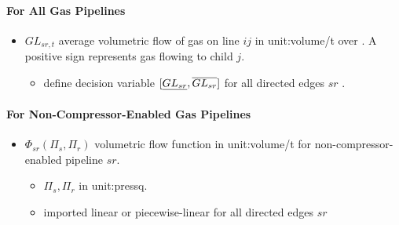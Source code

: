 \paragraph{For All Gas Pipelines}
\begin{itemize}

\item $GL_{sr,t}$ average volumetric flow of gas on line $ij$ in
\gls{unit:volume/t}
over \intervaloft{}. A positive sign represents gas flowing to child
  $j$.  \begin{itemize} \item \gls{define} decision variable
  $[\underline{GL_{sr}}, \overline{GL_{sr}}]$ for all directed edges
  $sr$ \atallt{}.  \end{itemize}
  \end{itemize}

\paragraph{For Non-Compressor-Enabled Gas Pipelines}
\begin{itemize}

\item $\Phi_{sr}(\Pi_s, \Pi_r)$ volumetric flow function in \gls{unit:volume/t}
for non-compressor-enabled pipeline $sr$.

  \begin{itemize}
  \item $\Pi_s, \Pi_r$ in \gls{unit:pressq}.
  \item \gls{imported} linear or piecewise-linear for all directed edges $sr$
  \end{itemize}

\end{itemize}
